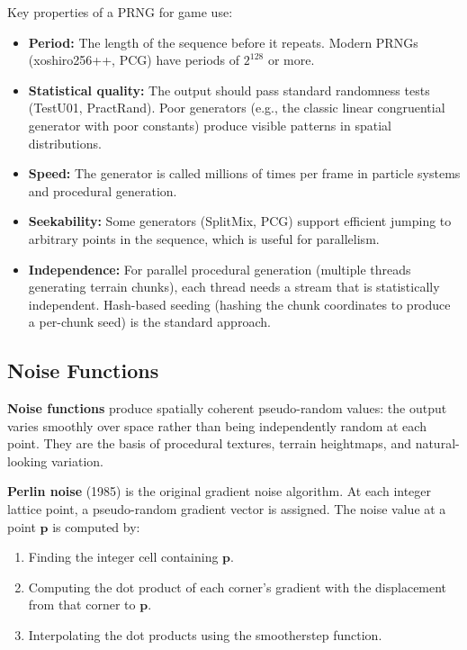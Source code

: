\documentclass[
  11pt,
  letterpaper,
  DIV=11,
  numbers=noendperiod,
  twoside,
  open=right]{scrreprt}
\providecommand{\tightlist}{%
  \setlength{\itemsep}{0pt}\setlength{\parskip}{0pt}}
\begin{document}
Key properties of a PRNG for game use:

\begin{itemize}
\tightlist
\item
  \textbf{Period:} The length of the sequence before it repeats. Modern
  PRNGs (xoshiro256++, PCG) have periods of \(2^{128}\) or more.
\item
  \textbf{Statistical quality:} The output should pass standard
  randomness tests (TestU01, PractRand). Poor generators (e.g., the
  classic linear congruential generator with poor constants) produce
  visible patterns in spatial distributions.
\item
  \textbf{Speed:} The generator is called millions of times per frame in
  particle systems and procedural generation.
\item
  \textbf{Seekability:} Some generators (SplitMix, PCG) support
  efficient jumping to arbitrary points in the sequence, which is useful
  for parallelism.
\item
  \textbf{Independence:} For parallel procedural generation (multiple
  threads generating terrain chunks), each thread needs a stream that is
  statistically independent. Hash-based seeding (hashing the chunk
  coordinates to produce a per-chunk seed) is the standard approach.
\end{itemize}

\subsection{Noise Functions}\label{noise-functions}

\textbf{Noise functions} produce spatially coherent pseudo-random
values: the output varies smoothly over space rather than being
independently random at each point. They are the basis of procedural
textures, terrain heightmaps, and natural-looking variation.

\textbf{Perlin noise} (1985) is the original gradient noise algorithm.
At each integer lattice point, a pseudo-random gradient vector is
assigned. The noise value at a point \(\mathbf{p}\) is computed by:

\begin{enumerate}
\def\labelenumi{\arabic{enumi}.}
\tightlist
\item
  Finding the integer cell containing \(\mathbf{p}\).
\item
  Computing the dot product of each corner's gradient with the
  displacement from that corner to \(\mathbf{p}\).
\item
  Interpolating the dot products using the smootherstep function.
\end{enumerate}
\end{document}
